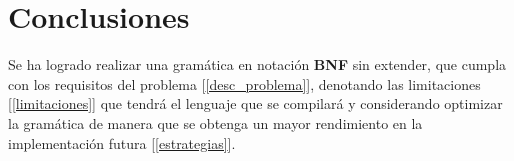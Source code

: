 \section{Conclusiones}
Se ha logrado realizar una gramática en notación \textbf{BNF} sin extender, que cumpla con los requisitos del problema [\ref{desc_problema}], denotando las limitaciones [\ref{limitaciones}] que tendrá el lenguaje que se compilará y considerando optimizar la gramática de manera que se obtenga un mayor rendimiento en la implementación futura [\ref{estrategias}].